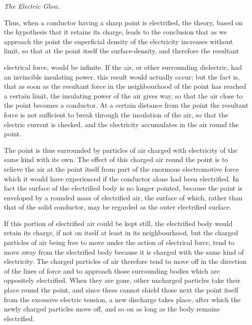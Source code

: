 \documentclass[11pt,a4paper]{article}
\begin{document}
\begin{center}
\textit{The Electric Glow.}
\end{center}

Thus, when a conductor having a sharp point is electrified,
the theory, based on the hypothesis that it retains its charge,
leads to the conclusion that as we approach the point the superficial
density of the electricity increases without limit, so that at
the point itself the surface-density, and therefore the resultant

\clearpage
\setcounter{footnote}{0}

electrical force, would be infinite. If the air, or other surrounding
dielectric, had an invincible insulating power, this result would
actually occur; but the fact is, that as soon as the resultant force
in the neighbourhood of the point has reached a certain limit, the
insulating power of the air gives way, so that the air close to
the point becomes a conductor. At a certain distance from the
point the resultant force is not sufficient to break through the
insulation of the air, so that the electric current is checked, and
the electricity accumulates in the air round the point.

The point is thus surrounded by particles of air charged with
electricity of the same kind with its own. The effect of this charged
air round the point is to relieve the air at the point itself from
part of the enormous electromotive force which it would have
experienced if the conductor alone had been electrified. In fact the
surface of the electrified body is no longer pointed, because the
point is enveloped by a rounded mass of electrified air, the surface
of which, rather than that of the solid conductor, may be regarded
as the outer electrified surface.

If this portion of electrified air could be kept still, the
electrified body would retain its charge, if not on itself at least in its
neighbourhood, but the charged particles of air being free to move
under the action of electrical force, tend to move away from the
electrified body because it is charged with the same kind of electricity.
The charged particles of air therefore tend to move off in the
direction of the lines of force and to approach those surrounding bodies
which are oppositely electrified. When they are gone, other
uncharged particles take their place round the point, and since these
cannot shield those next the point itself from the excessive electric
tension, a new discharge takes place, after which the newly
charged particles move off, and so on as long as the body remains
electrified.
\end{document}
